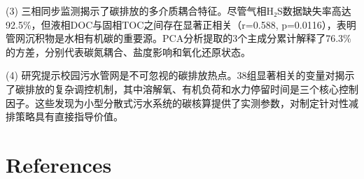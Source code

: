 \documentclass[12pt]{article}
\begin{document}
(3) 三相同步监测揭示了碳排放的多介质耦合特征。尽管气相H₂S数据缺失率高达92.5\%，但液相DOC与固相TOC之间存在显著正相关（r=0.588, p=0.0116），表明管网沉积物是水相有机碳的重要源。PCA分析提取的3个主成分累计解释了76.3\%的方差，分别代表碳氮耦合、盐度影响和氧化还原状态。

(4) 研究提示校园污水管网是不可忽视的碳排放热点。38组显著相关的变量对揭示了碳排放的复杂调控机制，其中溶解氧、有机负荷和水力停留时间是三个核心控制因子。这些发现为小型分散式污水系统的碳核算提供了实测参数，对制定针对性减排策略具有直接指导价值。

\section*{References}
\end{document}
